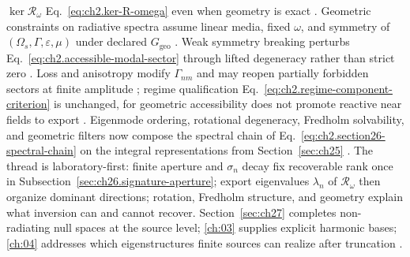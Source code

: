 \(\ker\mathcal{R}_\omega\) Eq.~\eqref{eq:ch2.ker-R-omega} even when geometry is
exact \cite{harrington2001}. Geometric constraints on radiative spectra assume linear media, fixed \(\omega\), and symmetry of
\((\Omega_s,\Gamma,\varepsilon,\mu)\) under declared \(G_{\mathrm{geo}}\)
\cite{stratton1941}. Weak symmetry breaking perturbs
Eq.~\eqref{eq:ch2.accessible-modal-sector} through lifted degeneracy
rather than strict zero \cite{stratton1941}. Loss and
anisotropy modify \(\Gamma_{nm}\) and may reopen partially forbidden sectors at finite
amplitude \cite{stratton1941}; regime qualification
Eq.~\eqref{eq:ch2.regime-component-criterion} is unchanged, for geometric accessibility does
not promote reactive near fields to export \cite{harrington2001}.
\medskip
\noindent
Eigenmode ordering, rotational degeneracy, Fredholm solvability, and geometric filters now
compose the spectral chain of Eq.~\eqref{eq:ch2.section26-spectral-chain} on the integral
representations from Section~\ref{sec:ch25} \cite{stratton1941}. The thread is laboratory-first:
finite aperture and $\sigma_n$ decay fix recoverable rank once in
Subsection~\ref{sec:ch26.signature-aperture}; export eigenvalues $\lambda_n$ of
$\mathcal{R}_\omega$ then organize dominant directions; rotation, Fredholm structure, and
geometry explain what inversion can and cannot recover. Section~\ref{sec:ch27} completes
non-radiating null spaces at the source level; \ref{ch:03} supplies explicit harmonic bases;
\ref{ch:04} addresses which eigenstructures finite sources can realize after truncation
\cite{harrington2001}.
